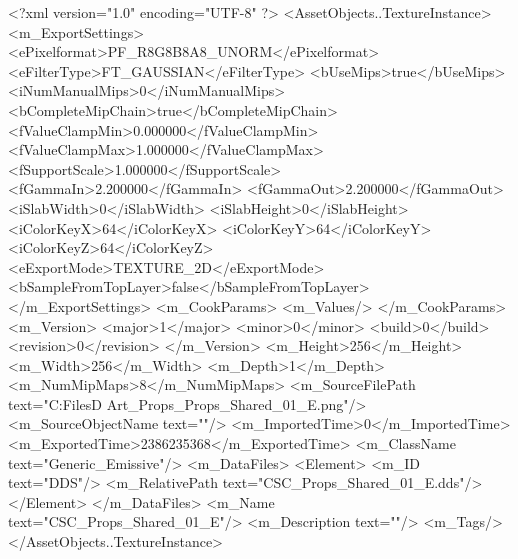 <?xml version="1.0" encoding="UTF-8" ?>
<AssetObjects..TextureInstance>
	<m_ExportSettings>
		<ePixelformat>PF_R8G8B8A8_UNORM</ePixelformat>
		<eFilterType>FT_GAUSSIAN</eFilterType>
		<bUseMips>true</bUseMips>
		<iNumManualMips>0</iNumManualMips>
		<bCompleteMipChain>true</bCompleteMipChain>
		<fValueClampMin>0.000000</fValueClampMin>
		<fValueClampMax>1.000000</fValueClampMax>
		<fSupportScale>1.000000</fSupportScale>
		<fGammaIn>2.200000</fGammaIn>
		<fGammaOut>2.200000</fGammaOut>
		<iSlabWidth>0</iSlabWidth>
		<iSlabHeight>0</iSlabHeight>
		<iColorKeyX>64</iColorKeyX>
		<iColorKeyY>64</iColorKeyY>
		<iColorKeyZ>64</iColorKeyZ>
		<eExportMode>TEXTURE_2D</eExportMode>
		<bSampleFromTopLayer>false</bSampleFromTopLayer>
	</m_ExportSettings>
	<m_CookParams>
		<m_Values/>
	</m_CookParams>
	<m_Version>
		<major>1</major>
		<minor>0</minor>
		<build>0</build>
		<revision>0</revision>
	</m_Version>
	<m_Height>256</m_Height>
	<m_Width>256</m_Width>
	<m_Depth>1</m_Depth>
	<m_NumMipMaps>8</m_NumMipMaps>
	<m_SourceFilePath text="C:\Users\Shadow\Desktop\Working Files\3D Art\Textures\CSC_Props\Current\textures\CSC_Props_Shared_01_E.png"/>
	<m_SourceObjectName text=""/>
	<m_ImportedTime>0</m_ImportedTime>
	<m_ExportedTime>2386235368</m_ExportedTime>
	<m_ClassName text="Generic_Emissive"/>
	<m_DataFiles>
		<Element>
			<m_ID text="DDS"/>
			<m_RelativePath text="CSC_Props_Shared_01_E.dds"/>
		</Element>
	</m_DataFiles>
	<m_Name text="CSC_Props_Shared_01_E"/>
	<m_Description text=""/>
	<m_Tags/>
</AssetObjects..TextureInstance>

